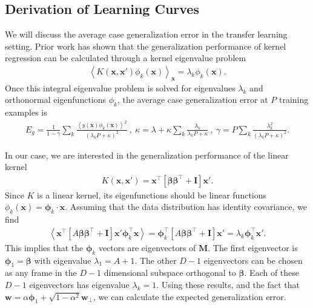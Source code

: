 \documentclass{article} %
\def\x{\bm x}
\begin{document}
\begin{appendix}
\subsection{Derivation of Learning Curves}
We will discuss the average case generalization error in the transfer learning setting. Prior work has shown that the generalization performance of kernel regression can be calculated through a kernel eigenvalue problem \citep{bordelon_icml_learning_curve,Canatar2021SpectralBA, loureiro_lenka_feature_maps}
\begin{align}
   \left< K(\x,\x') \phi_k(\x) \right>_{\x} = \lambda_k \phi_k(\x).
\end{align}
Once this integral eigenvalue problem is solved for eigenvalues $\lambda_k$ and orthonormal eigenfunctions $\phi_k$, the average case generalization error at $P$ training examples is
\begin{align}
    E_g = \frac{1}{1-\gamma} \sum_k \frac{\left< y(\x) \phi_k(\x) \right>^2}{(\lambda_k P + \kappa)^2} \ , \ \kappa = \lambda + \kappa \sum_{k} \frac{\lambda_k}{\lambda_k P + \kappa} \ , \ \gamma = P \sum_k \frac{\lambda_k^2}{(\lambda_k P + \kappa)^2}.
\end{align}

In our case, we are interested in the generalization performance of the linear kernel
\begin{align}
    K(\x,\x') = \x^\top \left[ \bm\beta \bm\beta^\top + \bm I \right] \x' .
\end{align}
Since $K$ is a linear kernel, its eigenfunctions should be linear functions $\phi_k(\x) = \bm\phi_k \cdot \x$. Assuming that the data distribution has identity covariance, we find
\begin{align}
    \left< \x^\top \left[ A \bm\beta \bm\beta^\top + \bm I \right] \x'  \bm\phi_k^\top \x  \right> = \bm\phi_k^\top \left[ A \bm\beta \bm\beta^\top + \bm I \right] \x' = \lambda_k \bm\phi_k^\top \x'.
\end{align}
This implies that the $\bm\phi_k$ vectors are eigenvectors of $\bm M$. The first eigenvector is $\bm\phi_1 = \bm \beta$ with eigenvalue $\lambda_1 = A + 1$. The other $D-1$ eigenvectors can be chosen as any frame in the $D-1$ dimensional subspace orthogonal to $\bm\beta$. Each of these $D-1$ eigenvectors has eigenvalue $\lambda_k = 1$. Using these results, and the fact that $\bm w = \alpha \bm \phi_1 + \sqrt{1-\alpha^2} \bm w_{\perp}$, we can calculate the expected generalization error.


\end{appendix}
\end{document}
